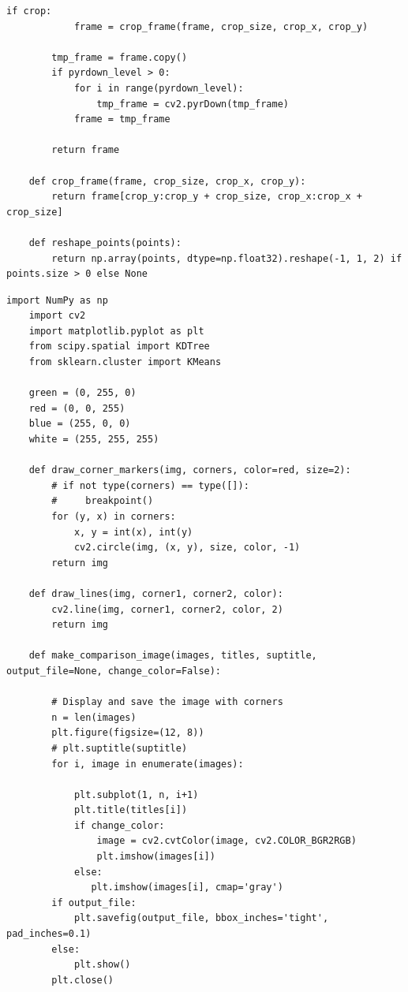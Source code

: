 \documentclass[11pt, conference, letterpaper]{IEEEtran}
\begin{document}
\begin{lstlisting}[style=python, caption={\texttt{video\_utils.py}}, label={lst:vutils}]
        if crop:
            frame = crop_frame(frame, crop_size, crop_x, crop_y)
         
        tmp_frame = frame.copy()
        if pyrdown_level > 0:
            for i in range(pyrdown_level):
                tmp_frame = cv2.pyrDown(tmp_frame)
            frame = tmp_frame
    
        return frame
        
    def crop_frame(frame, crop_size, crop_x, crop_y):
        return frame[crop_y:crop_y + crop_size, crop_x:crop_x + crop_size]
    
    def reshape_points(points):
        return np.array(points, dtype=np.float32).reshape(-1, 1, 2) if points.size > 0 else None
\end{lstlisting}

\begin{lstlisting}[style=python, caption={\texttt{plot\_utils.py}}, label={lst:putils}]
    import NumPy as np
    import cv2
    import matplotlib.pyplot as plt
    from scipy.spatial import KDTree
    from sklearn.cluster import KMeans
    
    green = (0, 255, 0)
    red = (0, 0, 255)
    blue = (255, 0, 0)
    white = (255, 255, 255)
    
    def draw_corner_markers(img, corners, color=red, size=2):
        # if not type(corners) == type([]):
        #     breakpoint()
        for (y, x) in corners:
            x, y = int(x), int(y)
            cv2.circle(img, (x, y), size, color, -1)
        return img
    
    def draw_lines(img, corner1, corner2, color):
        cv2.line(img, corner1, corner2, color, 2)
        return img
    
    def make_comparison_image(images, titles, suptitle, output_file=None, change_color=False):
        
        # Display and save the image with corners
        n = len(images)
        plt.figure(figsize=(12, 8))
        # plt.suptitle(suptitle)
        for i, image in enumerate(images):
    
            plt.subplot(1, n, i+1)
            plt.title(titles[i])
            if change_color:
                image = cv2.cvtColor(image, cv2.COLOR_BGR2RGB)
                plt.imshow(images[i])
            else:
               plt.imshow(images[i], cmap='gray') 
        if output_file:
            plt.savefig(output_file, bbox_inches='tight', pad_inches=0.1)
        else:
            plt.show()
        plt.close() 
            

\end{lstlisting}
\end{document}
